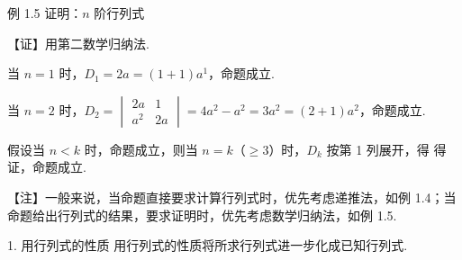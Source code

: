 \begin{fcard}{例 1.5}
证明：$n$ 阶行列式

【证】用第二数学归纳法.

当 $n=1$ 时，$D_1=2a=(1+1)a^{1}$，命题成立.

当 $n=2$ 时，$D_2=\begin{vmatrix}2a & 1\\ a^{2} & 2a\end{vmatrix}=4a^{2}-a^{2}=3a^{2}=(2+1)a^{2}$，命题成立.

假设当 $n<k$ 时，命题成立，则当 $n=k$（$\geqslant 3$）时，$D_k$ 按第 1 列展开，得
得证，命题成立.
\end{fcard}

\begin{fnote}
【注】一般来说，当命题直接要求计算行列式时，优先考虑递推法，如例 1.4；当命题给出行列式的结果，要求证明时，优先考虑数学归纳法，如例 1.5.
\end{fnote}


\begin{fcard}{1. 用行列式的性质}
用行列式的性质将所求行列式进一步化成已知行列式.
\end{fcard}

